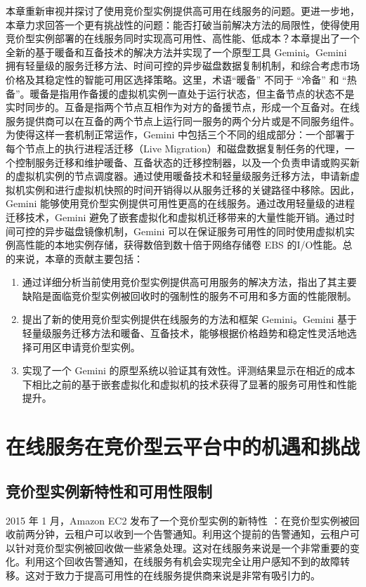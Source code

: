 本章重新审视并探讨了使用竞价型实例提供高可用在线服务的问题。更进一步地，本章力求回答一个更有挑战性的问题：能否打破当前解决方法的局限性，使得使用竞价型实例部署的在线服务同时实现高可用性、高性能、低成本？本章提出了一个全新的基于暖备和互备技术的解决方法并实现了一个原型工具 Gemini。Gemini 拥有轻量级的服务迁移方法、时间可控的异步磁盘数据复制机制，和综合考虑市场价格及其稳定性的智能可用区选择策略。这里，术语``暖备'' 不同于 ``冷备'' 和 ``热备''。暖备是指用作备援的虚拟机实例一直处于运行状态，但主备节点的状态不是实时同步的。互备是指两个节点互相作为对方的备援节点，形成一个互备对。在线服务提供商可以在互备的两个节点上运行同一服务的两个分片或是不同服务组件。为使得这样一套机制正常运作，Gemini 中包括三个不同的组成部分：一个部署于每个节点上的执行进程活迁移（Live Migration）和磁盘数据复制任务的代理，一个控制服务迁移和维护暖备、互备状态的迁移控制器，以及一个负责申请或购买新的虚拟机实例的节点调度器。通过使用暖备技术和轻量级服务迁移方法，申请新虚拟机实例和进行虚拟机快照的时间开销得以从服务迁移的关键路径中移除。因此，Gemini 能够使用竞价型实例提供可用性更高的在线服务。通过改用轻量级的进程迁移技术，Gemini 避免了嵌套虚拟化和虚拟机迁移带来的大量性能开销。通过时间可控的异步磁盘镜像机制，Gemini 可以在保证服务可用性的同时使用虚拟机实例高性能的本地实例存储，获得数倍到数十倍于网络存储卷 EBS 的I/O性能。总的来说，本章的贡献主要包括：
\begin{enumerate}
\item 通过详细分析当前使用竞价型实例提供高可用服务的解决方法，指出了其主要缺陷是面临竞价型实例被回收时的强制性的服务不可用和多方面的性能限制。
\item 提出了新的使用竞价型实例提供在线服务的方法和框架 Gemini。Gemini 基于轻量级服务迁移方法和暖备、互备技术，能够根据价格趋势和稳定性灵活地选择可用区申请竞价型实例。
\item 实现了一个 Gemini 的原型系统以验证其有效性。评测结果显示在相近的成本下相比之前的基于嵌套虚拟化和虚拟机的技术获得了显著的服务可用性和性能提升。
\end{enumerate}

\section{在线服务在竞价型云平台中的机遇和挑战}
\subsection{竞价型实例新特性和可用性限制}
2015 年 1 月，Amazon EC2 发布了一个竞价型实例的新特性 \cite{AWS_SITN:2016}：在竞价型实例被回收前两分钟，云租户可以收到一个告警通知。利用这个提前的告警通知，云租户可以针对竞价型实例被回收做一些紧急处理。这对在线服务来说是一个非常重要的变化。利用这个回收告警通知，在线服务有机会实现完全让用户感知不到的故障转移。这对于致力于提高可用性的在线服务提供商来说是非常有吸引力的。

